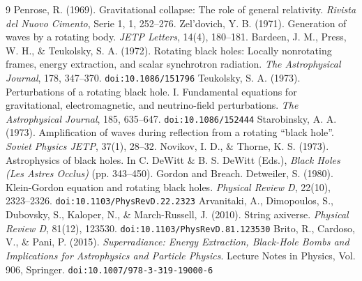 \documentclass[11pt,a4paper]{article}
\begin{document}
\begin{thebibliography}{9}
 Penrose, R. (1969). Gravitational collapse: The role of general relativity. \textit{Rivista del Nuovo Cimento}, Serie 1, 1, 252--276.
 Zel'dovich, Y. B. (1971). Generation of waves by a rotating body. \textit{JETP Letters}, 14(4), 180--181.
 Bardeen, J. M., Press, W. H., \& Teukolsky, S. A. (1972). Rotating black holes: Locally nonrotating frames, energy extraction, and scalar synchrotron radiation. \textit{The Astrophysical Journal}, 178, 347--370. \texttt{doi:10.1086/151796}
 Teukolsky, S. A. (1973). Perturbations of a rotating black hole. I. Fundamental equations for gravitational, electromagnetic, and neutrino-field perturbations. \textit{The Astrophysical Journal}, 185, 635--647. \texttt{doi:10.1086/152444}
 Starobinsky, A. A. (1973). Amplification of waves during reflection from a rotating ``black hole''. \textit{Soviet Physics JETP}, 37(1), 28--32.
 Novikov, I. D., \& Thorne, K. S. (1973). Astrophysics of black holes. In C. DeWitt \& B. S. DeWitt (Eds.), \textit{Black Holes (Les Astres Occlus)} (pp. 343--450). Gordon and Breach.
 Detweiler, S. (1980). Klein-Gordon equation and rotating black holes. \textit{Physical Review D}, 22(10), 2323--2326. \texttt{doi:10.1103/PhysRevD.22.2323}
 Arvanitaki, A., Dimopoulos, S., Dubovsky, S., Kaloper, N., \& March-Russell, J. (2010). String axiverse. \textit{Physical Review D}, 81(12), 123530. \texttt{doi:10.1103/PhysRevD.81.123530}
 Brito, R., Cardoso, V., \& Pani, P. (2015). \textit{Superradiance: Energy Extraction, Black-Hole Bombs and Implications for Astrophysics and Particle Physics}. Lecture Notes in Physics, Vol. 906, Springer. \texttt{doi:10.1007/978-3-319-19000-6}
\end{thebibliography}
\end{document}
